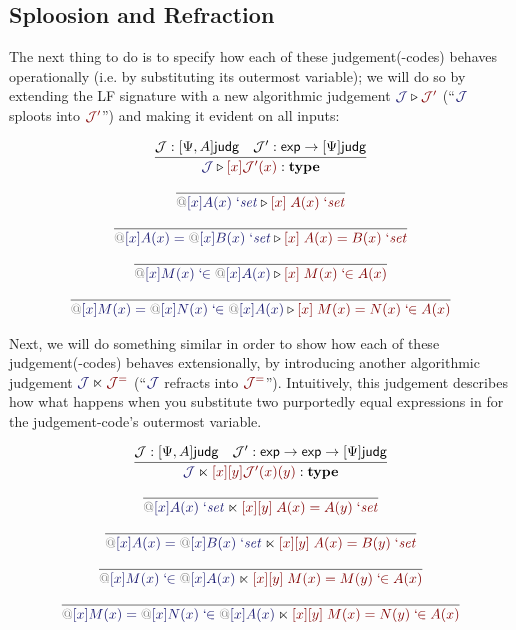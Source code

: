 \documentclass[acmtoplas]{acmtrans2m}
\makeatletter
\def\InputModeColorName{MidnightBlue}
\def\OutputModeColorName{Maroon}
\newcommand\InputMode[1]{{\color{\InputModeColorName}{#1}}}
\newcommand\OutputMode[1]{{\color{\OutputModeColorName}{#1}}}
\newcommand\type{\mathbf{type}}
\newcommand\sortexp{\mathsf{exp}}
\newcommand\sortj{\mathsf{judg}}
\newcommand\sortoj[1]{[#1]\sortj}
\newcommand\bind[2]{{\color{Gray}@}[#1]#2}
\newcommand\qisset[1]{#1\;`\mathit{set}}
\newcommand\qeqset[2]{#1=#2\;`\mathit{set}}
\newcommand\qmem[2]{#1\;`\!\!\in#2}
\newcommand\qeqmem[3]{#1=#2\;`\!\!\in#3}
\newcommand\sploot[2]{\InputMode{#1}\triangleright\OutputMode{#2}}
\newcommand\refract[2]{\InputMode{#1}\ltimes\OutputMode{#2}}
\newcommand\dname[1]{\mathcal{#1}}
\makeatother
\begin{document}
\subsection{Sploosion and Refraction}

The next thing to do is to specify how each of these judgement(-codes) behaves
operationally (i.e. by substituting its outermost variable); we will do so by
extending the LF signature with a new algorithmic judgement
$\sploot{\dname{J}}{\dname{J}'}$ (``$\InputMode{\dname{J}}$ sploots into
$\OutputMode{\dname{J}'}$'') and making it evident on all inputs:

\begin{gather*}
  \infer{
    \sploot{\dname{J}}{[x]\dname{J}'(x)}:\type
  }{
    \dname{J}:\sortoj{\Psi,A} &
    \dname{J}': \sortexp\to\sortoj\Psi
  }\\[6pt]
  \infer{
    \sploot{
      \qisset{\bind{x}{A(x)}}
    }{
      [x]\; \qisset{A(x)}
    }
  }{
  }\\[6pt]
  \infer{
    \sploot{
      \qeqset{\bind{x}{A(x)}}{\bind{x}{B(x)}}
    }{
      [x]\; \qeqset{A(x)}{B(x)}
    }
  }{
  }\\[6pt]
  \infer{
    \sploot{
      \qmem{\bind{x}{M(x)}}{\bind{x}{A(x)}}
    }{
      [x]\; \qmem{M(x)}{A(x)}
    }
  }{
  }\\[6pt]
  \infer{
    \sploot{
      \qeqmem{\bind{x}{M(x)}}{\bind{x}{N(x)}}{\bind{x}{A(x)}}
    }{
      [x]\; \qeqmem{M(x)}{N(x)}{A(x)}
    }
  }{
  }
\end{gather*}

Next, we will do something similar in order to show how each of these
judgement(-codes) behaves extensionally, by introducing another algorithmic
judgement $\refract{\dname{J}}{\dname{J}^=}$ (``$\InputMode{\dname{J}}$
refracts into $\OutputMode{\dname{J}^=}$''). Intuitively, this judgement
describes how what happens when you substitute two purportedly equal
expressions in for the judgement-code's outermost variable.

\begin{gather*}
  \infer{
    \refract{\dname{J}}{[x][y]\dname{J}'(x)(y)}:\type
  }{
    \dname{J}:\sortoj{\Psi,A} &
    \dname{J}': \sortexp\to\sortexp\to\sortoj\Psi
  }\\[6pt]
  \infer{
    \refract{
      \qisset{\bind{x}{A(x)}}
    }{
      [x][y]\; \qeqset{A(x)}{A(y)}
    }
  }{
  }\\[6pt]
  \infer{
    \refract{
      \qeqset{\bind{x}{A(x)}}{\bind{x}{B(x)}}
    }{
      [x][y]\; \qeqset{A(x)}{B(y)}
    }
  }{
  }\\[6pt]
  \infer{
    \refract{
      \qmem{\bind{x}{M(x)}}{\bind{x}{A(x)}}
    }{
      [x][y]\; \qeqmem{M(x)}{M(y)}{A(x)}
    }
  }{
  }\\[6pt]
  \infer{
    \refract{
      \qeqmem{\bind{x}{M(x)}}{\bind{x}{N(x)}}{\bind{x}{A(x)}}
    }{
      [x][y]\; \qeqmem{M(x)}{N(y)}{A(x)}
    }
  }{
  }
\end{gather*}
\end{document}
